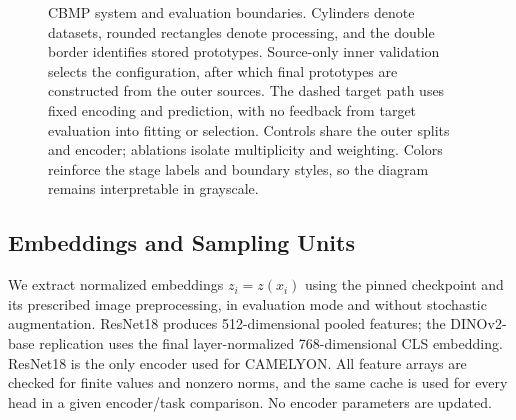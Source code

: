 \begin{figure}[t]
\caption{CBMP system and evaluation boundaries. Cylinders denote datasets, rounded rectangles denote processing, and the double border identifies stored prototypes. Source-only inner validation selects the configuration, after which final prototypes are constructed from the outer sources. The dashed target path uses fixed encoding and prediction, with no feedback from target evaluation into fitting or selection. Controls share the outer splits and encoder; ablations isolate multiplicity and weighting. Colors reinforce the stage labels and boundary styles, so the diagram remains interpretable in grayscale.}
\label{fig:cbmp_system}
\end{figure}

\subsection{Embeddings and Sampling Units}
We extract normalized embeddings $z_i=z(x_i)$ using the pinned checkpoint and its prescribed image preprocessing, in evaluation mode and without stochastic augmentation. ResNet18 produces 512-dimensional pooled features; the DINOv2-base replication uses the final layer-normalized 768-dimensional CLS embedding. ResNet18 is the only encoder used for CAMELYON. All feature arrays are checked for finite values and nonzero norms, and the same cache is used for every head in a given encoder/task comparison. No encoder parameters are updated.

